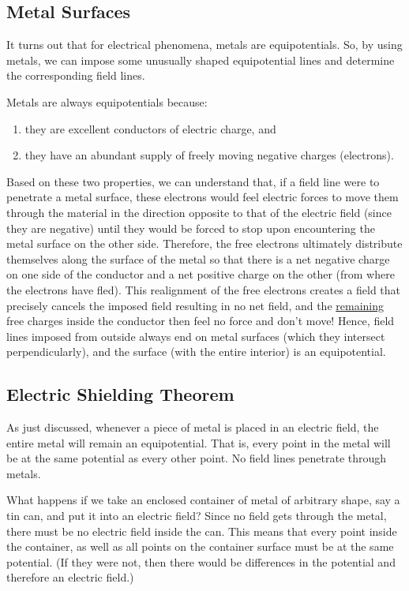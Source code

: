 \subsection{Metal Surfaces}

It turns out that for electrical phenomena, metals are equipotentials. So, by using metals, we can impose some unusually shaped equipotential lines and determine the corresponding field lines. \myskip

Metals are always equipotentials because:
\begin{enumerate}
    \item they are excellent conductors of electric charge, and
    \item they have an abundant supply of freely moving negative charges (electrons).
\end{enumerate}

Based on these two properties, we can understand that, if a field line were to penetrate a metal surface, these electrons would feel electric forces to move them through the material in the direction opposite to that of the electric field (since they are negative) until they would be forced to stop upon encountering the metal surface on the other side. Therefore, the free electrons ultimately distribute themselves along the surface of the metal so that there is a net negative charge on one side of the conductor and a net positive charge on the other (from where the electrons have fled). This realignment of the free electrons creates a field that precisely cancels the imposed field resulting in no net field, and the \underline{remaining} free charges inside the conductor then feel no force and don't move! Hence, field lines imposed from outside always end on metal surfaces (which they intersect perpendicularly), and the surface (with the entire interior) is an equipotential.

\subsection{Electric Shielding Theorem}

As just discussed, whenever a piece of metal is placed in an electric field, the entire metal will remain an equipotential. That is, every point in the metal will be at the same potential as every other point. No field lines penetrate through metals. \myskip

What happens if we take an enclosed container of metal of arbitrary shape, say a tin can, and put it into an electric field? Since no field gets through the metal, there must be no electric field inside the can. This means that every point inside the container, as well as all points on the container surface must be at the same potential. (If they were not, then there would be differences in the potential and therefore an electric field.) \myskip

